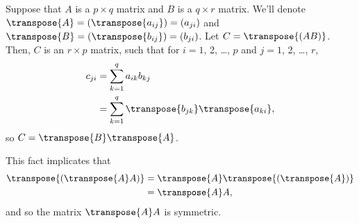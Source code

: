 Suppose that $A$ is a $p\times q$ matrix and $B$ is a $q\times r$ matrix.
We'll denote $\transpose{A}=(\transpose{a_{ij}})=(a_{ji})$ and $\transpose{B}=(\transpose{b_{ij}})=(b_{ji})$.
Let $C=\transpose{(AB)}$.
Then, $C$ is an $r\times p$ matrix, such that for $i=1$, 2, \dots, $p$ and $j=1$, 2, \dots, $r$,
\begin{align*}
    c_{ji} &= \sum_{k=1}^qa_{ik}b_{kj} \\
    &= \sum_{k=1}^q\transpose{b_{jk}}\transpose{a_{ki}},
\end{align*}
so $C=\transpose{B}\transpose{A}$.

This fact implicates that
\begin{align*}
    \transpose{(\transpose{A}A)} &= \transpose{A}\transpose{(\transpose{A})} \\
    &= \transpose{A}A,
\end{align*}
and so the matrix $\transpose{A}A$ is symmetric.
